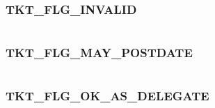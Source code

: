 \documentclass[letterpaper,10pt,english]{sphinxmanual}
\begin{document}
\subsubsection{TKT\_FLG\_INVALID}
\label{appdev/refs/macros/TKT_FLG_INVALID:tkt-flg-invalid-data}\label{appdev/refs/macros/TKT_FLG_INVALID::doc}\label{appdev/refs/macros/TKT_FLG_INVALID:tkt-flg-invalid}

\begin{fulllineitems}
\label{appdev/refs/macros/TKT_FLG_INVALID:TKT_FLG_INVALID}
\end{fulllineitems}


\begin{tabulary}{\linewidth}{|L|L|}
\hline

 & 
\\\hline
\end{tabulary}



\subsubsection{TKT\_FLG\_MAY\_POSTDATE}
\label{appdev/refs/macros/TKT_FLG_MAY_POSTDATE:tkt-flg-may-postdate}\label{appdev/refs/macros/TKT_FLG_MAY_POSTDATE::doc}\label{appdev/refs/macros/TKT_FLG_MAY_POSTDATE:tkt-flg-may-postdate-data}

\begin{fulllineitems}
\label{appdev/refs/macros/TKT_FLG_MAY_POSTDATE:TKT_FLG_MAY_POSTDATE}
\end{fulllineitems}


\begin{tabulary}{\linewidth}{|L|L|}
\hline

 & 
\\\hline
\end{tabulary}



\subsubsection{TKT\_FLG\_OK\_AS\_DELEGATE}
\label{appdev/refs/macros/TKT_FLG_OK_AS_DELEGATE:tkt-flg-ok-as-delegate-data}\label{appdev/refs/macros/TKT_FLG_OK_AS_DELEGATE:tkt-flg-ok-as-delegate}\label{appdev/refs/macros/TKT_FLG_OK_AS_DELEGATE::doc}
\end{document}

